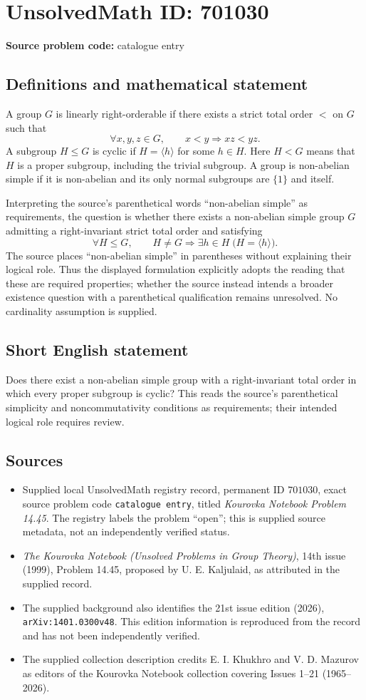 \documentclass[11pt]{article}
\begin{document}
\section*{UnsolvedMath ID: 701030}
\textbf{Source problem code:} catalogue entry
\subsection{Definitions and mathematical statement}
A group \(G\) is linearly right-orderable if there exists a strict total order \(<\) on \(G\) such that
\[
\forall x,y,z\in G,\qquad x<y\Longrightarrow xz<yz.
\]
A subgroup \(H\leq G\) is cyclic if \(H=\langle h\rangle\) for some \(h\in H\). Here \(H<G\) means that \(H\) is a proper subgroup, including the trivial subgroup. A group is non-abelian simple if it is non-abelian and its only normal subgroups are \(\{1\}\) and itself.

Interpreting the source's parenthetical words ``non-abelian simple'' as requirements, the question is whether there exists a non-abelian simple group \(G\) admitting a right-invariant strict total order and satisfying
\[
\forall H\leq G,\qquad H\neq G\Longrightarrow \exists h\in H\;\bigl(H=\langle h\rangle\bigr).
\]
The source places ``non-abelian simple'' in parentheses without explaining their logical role. Thus the displayed formulation explicitly adopts the reading that these are required properties; whether the source instead intends a broader existence question with a parenthetical qualification remains unresolved. No cardinality assumption is supplied.
\subsection{Short English statement}
Does there exist a non-abelian simple group with a right-invariant total order in which every proper subgroup is cyclic? This reads the source's parenthetical simplicity and noncommutativity conditions as requirements; their intended logical role requires review.
\subsection{Sources}
\begin{itemize}
\item Supplied local UnsolvedMath registry record, permanent ID \(701030\), exact source problem code \texttt{catalogue entry}, titled \emph{Kourovka Notebook Problem 14.45}. The registry labels the problem ``open''; this is supplied source metadata, not an independently verified status.
\item \emph{The Kourovka Notebook (Unsolved Problems in Group Theory)}, 14th issue (1999), Problem 14.45, proposed by U. E. Kaljulaid, as attributed in the supplied record.
\item The supplied background also identifies the 21st issue edition (2026), \texttt{arXiv:1401.0300v48}. This edition information is reproduced from the record and has not been independently verified.
\item The supplied collection description credits E. I. Khukhro and V. D. Mazurov as editors of the Kourovka Notebook collection covering Issues 1--21 (1965--2026).
\end{itemize}
\end{document}

